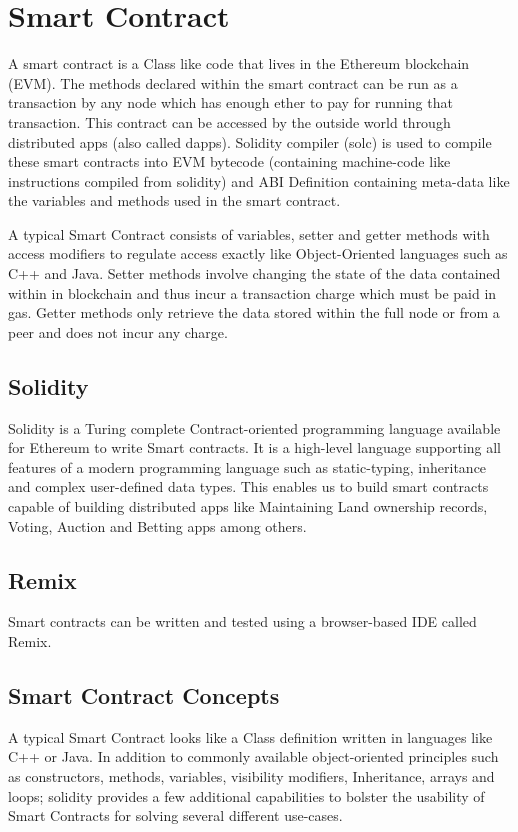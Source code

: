 \documentclass[11pt,openright]{report}
\begin{document}
\section{Smart Contract}
A smart contract is a Class like code that lives in the Ethereum blockchain (EVM). The methods declared within the smart contract can be run as a transaction by any node which has enough ether to pay for running that transaction. This contract can be accessed by the outside world through distributed apps (also called dapps). Solidity compiler (solc) is used to compile these smart contracts into EVM bytecode (containing machine-code like instructions compiled from solidity) and ABI Definition containing meta-data like the variables and methods used in the smart contract.

A typical Smart Contract consists of variables, setter and getter methods with access modifiers to regulate access exactly like Object-Oriented languages such as C++ and Java. Setter methods involve changing the state of the data contained within in blockchain and thus incur a transaction charge which must be paid in gas. Getter methods only retrieve the data stored within the full node or from a peer and does not incur any charge.

\subsection{Solidity}
Solidity is a Turing complete Contract-oriented programming language available for Ethereum to write Smart contracts. It is a high-level language supporting all features of a modern programming language such as static-typing, inheritance and complex user-defined data types. This enables us to build smart contracts capable of building distributed apps like Maintaining Land ownership records, Voting, Auction and Betting apps among others.

\subsection{Remix}
Smart contracts can be written and tested using a browser-based IDE called Remix.

\subsection{Smart Contract Concepts}
A typical Smart Contract looks like a Class definition written in languages like C++ or Java. In addition to commonly available object-oriented principles such as constructors, methods, variables, visibility modifiers, Inheritance, arrays and loops; solidity provides a few additional capabilities to bolster the usability of Smart Contracts for solving several different use-cases.
\end{document}
